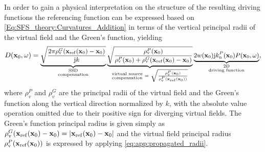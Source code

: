 In order to gain a physical interpretation on the structure of the resulting driving functions the referencing function can be expressed based on \eqref{Eq:SFS_theory:Curvatures_Addition} in terms of the vertical principal radii of the virtual field and the Green's function, yielding
\begin{equation}
\small
\label{Eq:SFS_theory:25D_WFS_driv_fun_ver_2}
D(\mathbf{x}_0, \omega) = 
\underbrace{\sqrt{\frac{2\pi \rho_\mathrm{v}^G(\mathbf{x}_{\mathrm{ref}}(\mathbf{x}_0)-\mathbf{x}_0) }{\mathrm{j} k}}}_{{\substack{\text{SSD}\\\text{compensation}}}}
\underbrace{\sqrt{ \frac{\rho_\mathrm{v}^P(\mathbf{x}_0) }{\rho_\mathrm{v}^P(\mathbf{x}_0) +  \rho_\mathrm{v}^G(\mathbf{x}_{\mathrm{ref}}(\mathbf{x}_0)-\mathbf{x}_0) } }}_{{\substack{\text{virtual source}\\\text{compensation}}} 
 \hspace{1mm} = \hspace{1mm}\sqrt{\frac{\rho_\mathrm{v}^P(\mathbf{x}_0)}{\rho_\mathrm{v}^P(\mathbf{x}_{\mathrm{ref}}(\mathbf{x}_0))}}
}
\underbrace{2 w(\mathbf{x}_0)  \mathrm{j} k_{\mathrm{n}}^P(\mathbf{x}_0) 	P(\mathbf{x}_0,\omega)}_{\substack{\text{2D}\\\text{driving function}}},
\end{equation}
where $\rho_v^P$ and $\rho_v^G$ are the principal radii of the virtual field and the Green's function along the vertical direction normalized by $k$, with the absolute value operation omitted due to their positive sign for diverging virtual fields.
The Green's function principal radius is given simply as $\rho_\mathrm{v}^G(\mathbf{x}_{\mathrm{ref}}(\mathbf{x}_0)-\mathbf{x}_0) = |\mathbf{x}_{\mathrm{ref}}(\mathbf{x}_0)-\mathbf{x}_0|$ and the virtual field principal radius $\rho_\mathrm{v}^P(\mathbf{x}_{\mathrm{ref}}(\mathbf{x}_0))$ is expressed by applying \eqref{eq:app:propagated_radii}.

